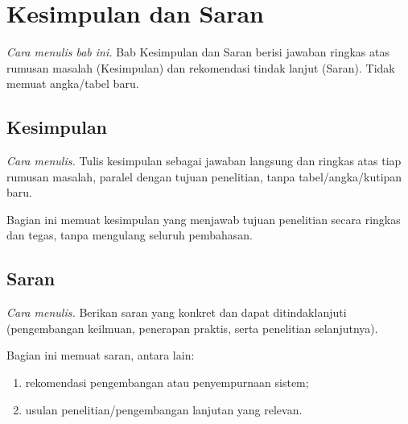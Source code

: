 \chapter{Kesimpulan dan Saran}
\emph{Cara menulis bab ini.} Bab Kesimpulan dan Saran berisi jawaban ringkas atas rumusan masalah (Kesimpulan) dan rekomendasi tindak lanjut (Saran). Tidak memuat angka/tabel baru.


\section{Kesimpulan}
\emph{Cara menulis.} Tulis kesimpulan sebagai jawaban langsung dan ringkas atas tiap rumusan masalah, paralel dengan tujuan penelitian, tanpa tabel/angka/kutipan baru.

Bagian ini memuat kesimpulan yang menjawab tujuan penelitian secara ringkas dan
tegas, tanpa mengulang seluruh pembahasan.

\section{Saran}
\emph{Cara menulis.} Berikan saran yang konkret dan dapat ditindaklanjuti (pengembangan keilmuan, penerapan praktis, serta penelitian selanjutnya).

Bagian ini memuat saran, antara lain:
\begin{enumerate}[leftmargin=*]
  \item rekomendasi pengembangan atau penyempurnaan sistem;
  \item usulan penelitian/pengembangan lanjutan yang relevan.
\end{enumerate}
